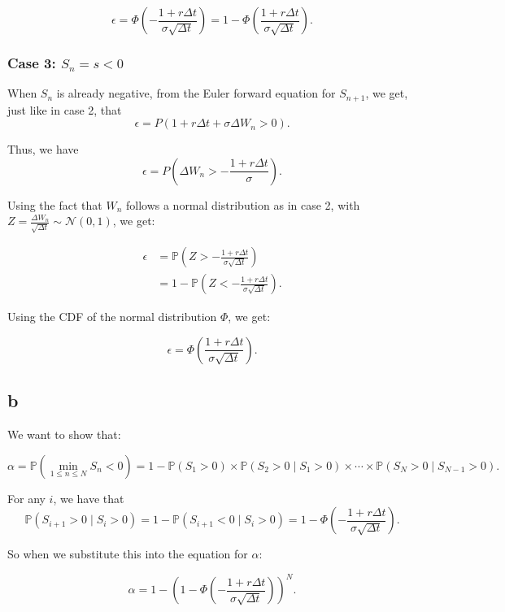 \documentclass[a4paper,12pt]{article} %
\begin{document}
\begin{equation}
    \epsilon = \Phi\left(- \frac{1 + r \Delta t}{\sigma \sqrt{\Delta t}}\right) = 1 - \Phi\left(\frac{1 + r \Delta t}{\sigma \sqrt{\Delta t}}\right).
\end{equation}

\subsubsection{Case 3: $S_n = s < 0$}
When $S_n$ is already negative, from the Euler forward equation for $S_{n+1}$, we get, just like in case 2, that
$$\epsilon =P(1 + r \Delta t + \sigma \Delta W_n > 0).$$

Thus, we have
$$\epsilon =P\left(\Delta W_n > - \frac{1 + r \Delta t}{\sigma}\right).$$

Using the fact that $W_n$ follows a normal distribution as in case 2, with $Z = \frac{\Delta W_n}{\sqrt{\Delta t}} \sim \mathcal{N}(0, 1)$, we get:

\begin{align}
    \epsilon & = \mathbb{P}\left(Z > - \frac{1 + r \Delta t}{\sigma \sqrt{\Delta t}}\right)      \\
             & = 1 - \mathbb{P}\left(Z < - \frac{1 + r \Delta t}{\sigma \sqrt{\Delta t}}\right).
\end{align}

Using the CDF of the normal distribution $\Phi$, we get:

\begin{equation}
    \epsilon = \Phi\left(\frac{1 + r \Delta t}{\sigma \sqrt{\Delta t}}\right).
\end{equation}

\subsection{b}
We want to show that:

\[
    \alpha = \mathbb{P}\left(\min_{1 \leq n \leq N} S_n < 0\right) = 1 - \mathbb{P}(S_1 > 0) \times \mathbb{P}(S_2 > 0 \mid S_1 > 0) \times \cdots \times \mathbb{P}(S_N > 0 \mid S_{N-1} > 0).
\]

For any $i$, we have that
$$\mathbb{P}(S_{i+1} > 0 \mid S_i > 0) = 1 - \mathbb{P}(S_{i+1} < 0 \mid S_i > 0) = 1 - \Phi\left(- \frac{1 + r \Delta t}{\sigma \sqrt{\Delta t}}\right).$$

So when we substitute this into the equation for $\alpha$:

\[
    \alpha = 1 - \left(1 - \Phi\left(- \frac{1 + r \Delta t}{\sigma \sqrt{\Delta t}}\right)\right)^N.
\]
\end{document}
